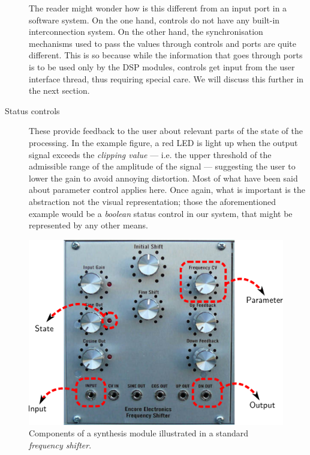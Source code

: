 \begin{description}
  The reader might wonder how is this different from an input port in
  a software system. On the one hand, controls do not have any
  built-in interconnection system. On the other hand, the
  synchronisation mechanisms used to pass the values through controls
  and ports are quite different. This is so because while the
  information that goes through ports is to be used only by the DSP
  modules, controls get input from the user interface thread, thus
  requiring special care. We will discuss this further in the next
  section.

\item[Status controls] These provide feedback to
  the user about relevant parts of the state of the processing. In the
  example figure, a red LED is light up when the output signal exceeds
  the \emph{clipping value} --- i.e. the upper
  threshold of the admissible range of the amplitude of the signal ---
  suggesting the user to lower the gain to avoid annoying
  distortion. Most of what have been said about parameter control
  applies here. Once again, what is important is the abstraction not
  the visual representation; those the aforementioned example would be
  a \emph{boolean} status control in our system, that might be
  represented by any other means.
\end{description}

\begin{figure}
  \centering
  \includegraphics[width=.9\textwidth]{pic/hwmod.pdf}
  \caption{Components of a synthesis module illustrated in a standard
    \emph{frequency shifter}.}
  \label{fig:hwmod}
\end{figure}

